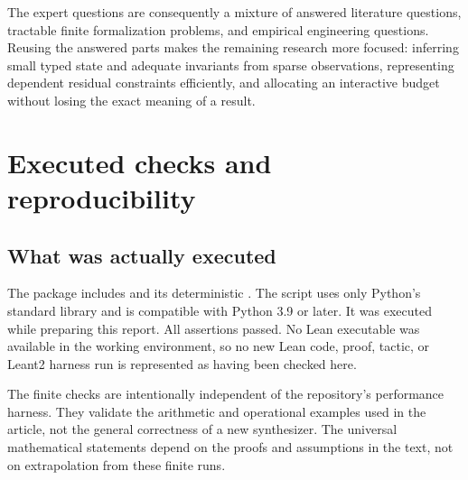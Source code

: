 \documentclass[11pt,a4paper]{article}
\theoremstyle{definition}
\theoremstyle{remark}
\begin{document}
The expert questions are consequently a mixture of answered literature
questions, tractable finite formalization problems, and empirical engineering
questions. Reusing the answered parts makes the remaining research more
focused: inferring small typed state and adequate invariants from sparse
observations, representing dependent residual constraints efficiently, and
allocating an interactive budget without losing the exact meaning of a result.

\appendix
\section{Executed checks and reproducibility}
\label{sec:validation}

\subsection{What was actually executed}
The package includes
 and its deterministic
. The script uses only Python's standard library
and is compatible with Python 3.9 or later. It was executed while preparing
this report. All assertions passed. No Lean executable was available in the
working environment, so no new Lean code, proof, tactic, or Leant2 harness run
is represented as having been checked here.

The finite checks are intentionally independent of the repository's performance
harness. They validate the arithmetic and operational examples used in the
article, not the general correctness of a new synthesizer. The universal
mathematical statements depend on the proofs and assumptions in the text,
not on extrapolation from these finite runs.
\end{document}
